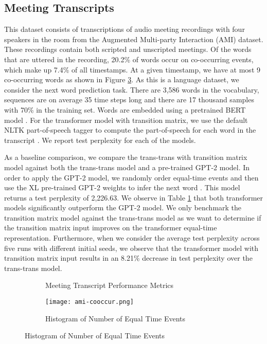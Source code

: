 \documentclass[reqno ,11pt]{article}
\begin{document}
\subsection{Meeting Transcripts} This dataset consists of transcriptions of audio meeting recordings with four speakers in the room from the Augmented Multi-party Interaction (AMI) dataset. These recordings contain both scripted and unscripted meetings. Of the words that are uttered in the recording, 20.2\% of words occur on co-occurring events, which make up 7.4\% of all timestamps. At a given timestamp, we have at most 9 co-occurring words as shown in Figure \ref{fig:ami-eq-time}.  As this is a language dataset, we consider the next word prediction task. There are 3,586 words in the vocabulary, sequences are on average 35 time steps long and there are 17 thousand samples with 70\% in the training set. Words are embedded using a pretrained BERT model \cite{bert}. For the transformer model with transition matrix, we use the default NLTK part-of-speech tagger to compute the part-of-speech for each word in the transcript \cite{nltk}. We report test perplexity for each of the models.

As a baseline comparison, we compare the trans-trans with transition matrix model against both the trans-trans model and a pre-trained GPT-2 model. In order to apply the GPT-2 model, we randomly order equal-time events and then use the XL pre-trained GPT-2 weights to infer the next word  \cite{gpt-2}. This model returns a test perplexity of 2,226.63. We observe in Table \ref{tab:AMI-metrics} that both transformer models significantly outperform the GPT-2 model. We only benchmark the transition matrix model against the trans-trans model as we want to determine if the transition matrix input improves on the transformer equal-time representation. Furthermore, when we consider the average test perplexity across five runs with different initial seeds, we observe that the transformer model with transition matrix input results in an 8.21\% decrease in test perplexity over the trans-trans model. 

\begin{figure}[h]
\begin{subfigure}[t]{0.4\textwidth}
\begin{center}
\caption{Meeting Transcript Performance Metrics}

\label{tab:AMI-metrics}
\end{center}
\end{subfigure}
\begin{subfigure}[t]{0.6\textwidth}
 \caption{Histogram of Number of Equal Time Events}
\centering
\texttt{[image: ami-cooccur.png]}
  \label{fig:ami-eq-time}
\end{subfigure}
\end{figure}
\end{document}

